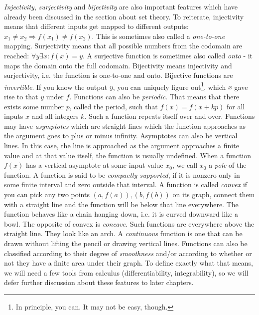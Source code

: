 \emph{Injectivity}, \emph{surjectivity} and \emph{bijectivity} are also important features which have already been discussed in the section about set theory. To reiterate, injectivity means that different inputs get mapped to different outputs: $x_1 \neq x_2 \Rightarrow f(x_1) \neq f(x_2)$. This is sometimes also called a \emph{one-to-one} mapping. Surjectivity means that all possible numbers from the codomain are reached: $\forall y \exists x: f(x) = y$. A surjective function is sometimes also called \emph{onto} - it maps the domain onto the full codomain. Bijectivity means injectivity and surjectivity, i.e. the function is one-to-one and onto. Bijective functions are \emph{invertible}. If you know the output $y$, you can uniquely figure out\footnote{In principle, you can. It may not be easy, though.}, which $x$ gave rise to that $y$ under $f$. Functions can also be \emph{periodic}. That means that there exists some number $p$, called the period, such that $f(x) = f(x + k p)$ for all inputs $x$ and all integers $k$. Such a function repeats itself over and over. Functions may have \emph{asymptotes} which are straight lines which the function approaches as the argument goes to plus or minus infinity. Asymptotes can also be vertical lines. In this case, the line is approached as the argument approaches a finite value and at that value itself, the function is usually undefined. When a function $f(x)$ has a vertical asymptote at some input value $x_0$, we call $x_0$ a \emph{pole} of the function. A function is said to be \emph{compactly supported}, if it is nonzero only in some finite interval and zero outside that interval. A function is called \emph{convex} if you can pick any two points $(a,f(a)),(b,f(b))$ on its graph, connect them with a straight line and the function will be below that line everywhere. The function behaves like a chain hanging down, i.e. it is curved downward like a bowl. The opposite of convex is \emph{concave}. Such functions are everywhere above the straight line. They look like an arch. A \emph{continuous} function is one that can be drawn without lifting the pencil or drawing vertical lines. Functions can also be classified according to their degree of \emph{smoothness} and/or according to whether or not they have a finite area under their graph. To define exactly what that means, we will need a few tools from calculus (differentiability, integrability), so we will defer further discussion about these features to later chapters.



